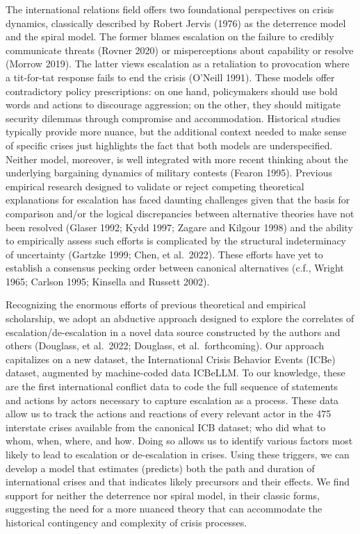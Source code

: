 \documentclass[
]{article}
\begin{document}
The international relations field offers two foundational perspectives
on crisis dynamics, classically described by Robert Jervis (1976) as the
deterrence model and the spiral model. The former blames escalation on
the failure to credibly communicate threats (Rovner 2020) or
misperceptions about capability or resolve (Morrow 2019). The latter
views escalation as a retaliation to provocation where a tit-for-tat
response fails to end the crisis (O'Neill 1991). These models offer
contradictory policy prescriptions: on one hand, policymakers should use
bold words and actions to discourage aggression; on the other, they
should mitigate security dilemmas through compromise and accommodation.
Historical studies typically provide more nuance, but the additional
context needed to make sense of specific crises just highlights the fact
that both models are underspecified. Neither model, moreover, is well
integrated with more recent thinking about the underlying bargaining
dynamics of military contests (Fearon 1995). Previous empirical research
designed to validate or reject competing theoretical explanations for
escalation has faced daunting challenges given that the basis for
comparison and/or the logical discrepancies between alternative theories
have not been resolved (Glaser 1992; Kydd 1997; Zagare and Kilgour 1998)
and the ability to empirically assess such efforts is complicated by the
structural indeterminacy of uncertainty (Gartzke 1999; Chen, et
al.~2022). These efforts have yet to establish a consensus pecking order
between canonical alternatives (c.f., Wright 1965; Carlson 1995;
Kinsella and Russett 2002).

Recognizing the enormous efforts of previous theoretical and empirical
scholarship, we adopt an abductive approach designed to explore the
correlates of escalation/de-escalation in a novel data source
constructed by the authors and others (Douglass, et al.~2022; Douglass,
et al.~forthcoming). Our approach capitalizes on a new dataset, the
International Crisis Behavior Events (ICBe) dataset, augmented by
machine-coded data ICBeLLM. To our knowledge, these are the first
international conflict data to code the full sequence of statements and
actions by actors necessary to capture escalation as a process. These
data allow us to track the actions and reactions of every relevant actor
in the 475 interstate crises available from the canonical ICB dataset;
who did what to whom, when, where, and how. Doing so allows us to
identify various factors most likely to lead to escalation or
de-escalation in crises. Using these triggers, we can develop a model
that estimates (predicts) both the path and duration of international
crises and that indicates likely precursors and their effects. We find
support for neither the deterrence nor spiral model, in their classic
forms, suggesting the need for a more nuanced theory that can
accommodate the historical contingency and complexity of crisis
processes.
\end{document}
